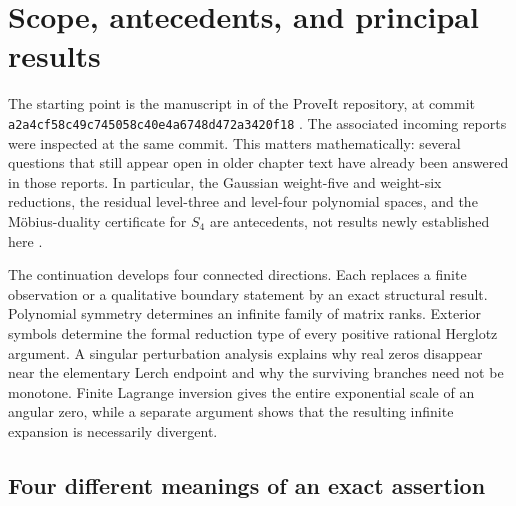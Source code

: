 \section{Scope, antecedents, and principal results}
\label{intro:sec:scope}

The starting point is the manuscript in
 of the ProveIt repository,
at commit \texttt{a2a4cf58c49c745058c40e4a6748d472a3420f18}
\cite{ProveItSnapshot}. The associated incoming reports were inspected
at the same commit. This matters mathematically: several questions that
still appear open in older chapter text have already been answered in
those reports. In particular, the Gaussian weight-five and weight-six
reductions, the residual level-three and level-four polynomial spaces,
and the Möbius-duality certificate for $S_4$ are antecedents, not results
newly established here \cite{PriorResearch,PriorRigidity}.

The continuation develops four connected directions. Each replaces a
finite observation or a qualitative boundary statement by an exact
structural result. Polynomial symmetry determines an infinite family of
matrix ranks. Exterior symbols determine the formal reduction type of
every positive rational Herglotz argument. A singular perturbation
analysis explains why real zeros disappear near the elementary Lerch
endpoint and why the surviving branches need not be monotone. Finite
Lagrange inversion gives the entire exponential scale of an angular
zero, while a separate argument shows that the resulting infinite
expansion is necessarily divergent.

\subsection{Four different meanings of an exact assertion}

